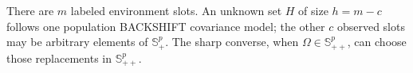 There are \(m\) labeled environment slots. An unknown set \(H\) of size \(h=m-c\) follows one population BACKSHIFT covariance model; the other \(c\) observed slots may be arbitrary elements of \(\mathbb S_+^p\). The sharp converse, when \(\Omega\in\mathbb S_{++}^p\), can choose those replacements in \(\mathbb S_{++}^p\).